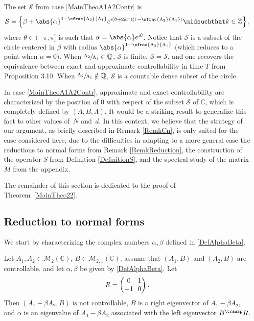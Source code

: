 \begin{remk}
The set $\mathcal S$ from case \eqref{MainTheoA1A2Contr} is
\[
\mathcal S = \left\{\beta + \abs{\alpha}^{1 - \sfrac{\Lambda_2}{\Lambda_1}} e^{i (\theta + 2 k \pi)\left(1 - \sfrac{\Lambda_2}{\Lambda_1}\right)} \midsuchthat k \in \mathbb Z\right\},
\]
where $\theta \in (-\pi, \pi]$ is such that $\alpha = \abs{\alpha} e^{i\theta}$. Notice that $\mathcal S$ is a subset of the circle centered in $\beta$ with radius $\abs{\alpha}^{1 - \sfrac{\Lambda_2}{\Lambda_1}}$ (which reduces to a point when $\alpha = 0$). When $\sfrac{\Lambda_2}{\Lambda_1} \in \mathbb Q$, $\mathcal S$ is finite, $\overline{\mathcal S} = \mathcal S$, and one recovers the equivalence between exact and approximate controllability in time $T$ from Proposition 3.10. When $\sfrac{\Lambda_2}{\Lambda_1} \notin \mathbb Q$, $\mathcal S$ is a countable dense subset of the circle.
\end{remk}

\begin{remk}
In case \eqref{MainTheoA1A2Contr}, approximate and exact controllability are characterized by the position of $0$ with respect of the subset $\mathcal S$ of $\mathbb C$, which is completely defined by $(A, B, \Lambda)$. It would be a striking result to generalize this fact to other values of~$N$ and~$d$. In this context, we believe that the strategy of our argument, as briefly described in Remark \ref{RemkCn}, is only suited for the case considered here, due to the difficulties in adapting to a more general case the reductions to normal forms from Remark \ref{RemkReduction}, the construction of the operator $S$ from Definition \ref{DefinitionS}, and the spectral study of the matrix $M$ from the appendix.
\end{remk}

The remainder of this section is dedicated to the proof of Theorem~\ref{MainTheo22}.

\subsection{Reduction to normal forms}
\label{SecReduction}

We start by characterizing the complex numbers $\alpha, \beta$ defined in \eqref{DefAlphaBeta}.

\begin{lemm}
\label{LemmAlphaEigenvalue}
Let $A_1, A_2 \in \mathcal M_2(\mathbb C)$, $B \in \mathcal M_{2, 1}(\mathbb C)$, assume that $(A_1, B)$ and $(A_2, B)$ are controllable, and let $\alpha, \beta$ be given by \eqref{DefAlphaBeta}. Let
\begin{equation}
\label{DefR}\arraycolsep3.5pt
R = \begin{pmatrix}
0 & 1 \\
-1 & 0 \\
\end{pmatrix}.
\end{equation}
Then $(A_1 - \beta A_2, B)$ is not controllable, $B$ is a right eigenvector of $A_1 - \beta A_2$, and $\alpha$ is an eigenvalue of $A_1 - \beta A_2$ associated with the left eigenvector $B^\transp R$.
\end{lemm}

